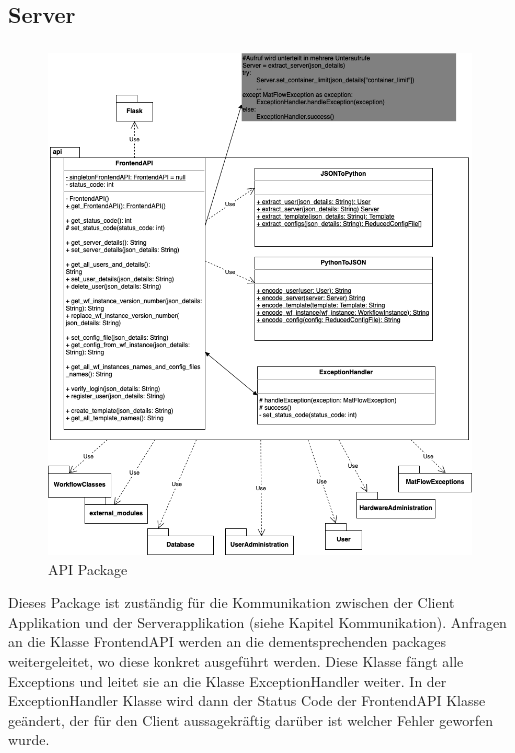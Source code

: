 \subsection{Server}

\subsubsection{}
\begin{figure}[h]
    \includegraphics[width=1\textwidth]{res/api.drawio.png}
    \caption{API Package}
\end{figure}
Dieses Package ist zuständig für die Kommunikation zwischen der Client Applikation und der Serverapplikation (siehe Kapitel 
Kommunikation). Anfragen an die Klasse FrontendAPI werden an die dementsprechenden packages weitergeleitet, wo diese konkret 
ausgeführt werden. Diese Klasse fängt alle Exceptions und leitet sie an die Klasse ExceptionHandler weiter.
In der ExceptionHandler Klasse wird dann der Status Code der FrontendAPI Klasse geändert, der für den Client aussagekräftig
darüber ist welcher Fehler geworfen wurde.

